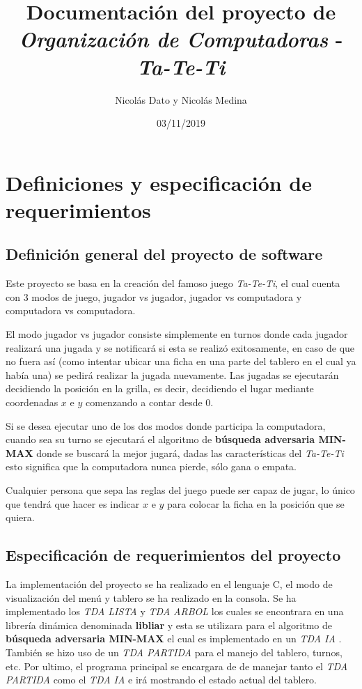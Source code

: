 \documentclass[12pt,a4paper]{article}
\title{Documentaci\'on del proyecto de \emph{Organizaci\'on de Computadoras} - \emph{Ta-Te-Ti}}
\author{Nicol\'as Dato y Nicol\'as Medina}
\date{03/11/2019}
\begin{document}
\maketitle

\newpage
\tableofcontents
\newpage

\section{Definiciones y especificaci\'on de requerimientos}

\subsection{Definici\'on general del proyecto de software}
	Este proyecto se basa en la creaci\'on del famoso juego \emph{Ta-Te-Ti}, el cual cuenta con 3 modos de juego, jugador vs jugador, jugador vs computadora y computadora vs computadora.

	El modo jugador vs jugador consiste simplemente en turnos donde cada jugador realizar\'a una jugada y se notificar\'a si esta se realiz\'o exitosamente, en caso de que no fuera as\'i (como intentar ubicar una ficha en una parte del tablero en el cual ya hab\'ia una) se pedir\'a realizar la jugada nuevamente. Las jugadas se ejecutar\'an decidiendo la posici\'on en la grilla, es decir, decidiendo el lugar mediante coordenadas $x$ e $y$ comenzando a contar desde $0$.

	Si se desea ejecutar uno de los dos modos donde participa la computadora, cuando sea su turno se ejecutar\'a el algoritmo de {\bf b\'usqueda adversaria MIN-MAX} donde se buscar\'a la mejor jugar\'a, dadas las caracter\'isticas del \emph{Ta-Te-Ti} esto significa que la computadora nunca pierde, s\'olo gana o empata.

    Cualquier persona que sepa las reglas del juego puede ser capaz de jugar, lo \'unico que tendr\'a que hacer es indicar $x$ e $y$ para colocar la ficha en la posici\'on que se quiera.

\subsection{Especificaci\'on de requerimientos del proyecto}
    La implementaci\'on del proyecto se ha realizado en el lenguaje C, el modo de visualizaci\'on del men\'u y tablero se ha realizado en la consola. Se ha implementado los {\itshape TDA LISTA} y {\itshape TDA ARBOL} los cuales se encontrara en una librer\'ia din\'amica denominada {\bf libliar} y esta se utilizara para el algoritmo de {\bf b\'usqueda adversaria MIN-MAX} el cual es implementado en un {\itshape TDA IA} . Tambi\'en se hizo uso de un {\itshape TDA PARTIDA} para el manejo del tablero, turnos, etc. Por ultimo, el programa principal se encargara de de manejar tanto el {\itshape TDA PARTIDA} como el {\itshape TDA IA} e ir\'a mostrando el estado actual del tablero.
\end{document}
